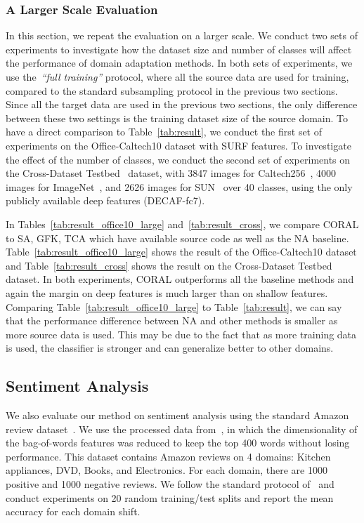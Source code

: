 \documentclass[letterpaper]{article}
\begin{document}
\subsubsection{A Larger Scale Evaluation}
\label{subsubsec:larger}
In this section, we repeat the evaluation on a larger scale. We conduct two sets of experiments to investigate how the dataset size and number of classes will affect the performance of domain adaptation methods. In both sets of experiments, we use the~\emph{``full training''} protocol, where all the source data are used for training, compared to the standard subsampling protocol in the previous two sections. Since all the target data are used in the previous two sections, the only difference between these two settings is the training dataset size of the source domain. To have a direct comparison to Table~\ref{tab:result}, we conduct the first set of experiments on the Office-Caltech10 dataset with SURF features. To investigate the effect of the number of classes, we conduct the second set of experiments on the Cross-Dataset Testbed~\cite{cross_dataset} dataset, with 3847 images for Caltech256~\cite{caltech256}, 4000 images for ImageNet~\cite{imagenet}, and 2626 images for SUN~\cite{sun_data} over 40 classes, using the only publicly available deep features (DECAF-fc7).

In Tables~\ref{tab:result_office10_large} and~\ref{tab:result_cross}, we compare CORAL to SA, GFK, TCA which have available source code as well as the NA baseline. Table~\ref{tab:result_office10_large} shows the result of the Office-Caltech10 dataset and Table~\ref{tab:result_cross} shows the result on the Cross-Dataset Testbed dataset. In both experiments, CORAL outperforms all the baseline methods and again the margin on deep features is much larger than on shallow features. Comparing Table~\ref{tab:result_office10_large} to Table~\ref{tab:result}, we can say that the performance difference between NA and other methods is smaller as more source data is used. This may be due to the fact that as more training data is used, the classifier is stronger and can generalize better to other domains.

\subsection{Sentiment Analysis}
We also evaluate our method on sentiment analysis using the standard Amazon review dataset~\cite{Blitzer07Biographies,gong-icml13}. We use the processed data from~\cite{gong-icml13}, in which the dimensionality of the bag-of-words features was reduced to keep the top 400 words without losing performance. This dataset contains Amazon reviews on 4 domains: Kitchen appliances, DVD, Books, and Electronics. For each domain, there are 1000 positive and 1000 negative reviews. We follow the standard protocol of~\cite{gong-icml13} and conduct experiments on 20 random training/test splits and report the mean accuracy for each domain shift.
\end{document}
